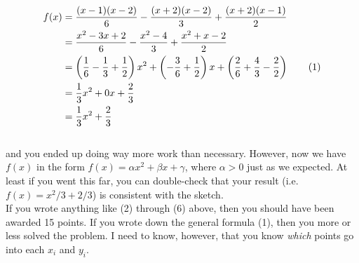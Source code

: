 \documentclass{article}
\newcommand\numberthis{\addtocounter{equation}{1}\tag{\theequation}}
\def\a{\alpha}
\def\b{\beta}
\def\c{\gamma}
\begin{document}
\begin{align*}
f(x)  &=  \frac{(x - 1)(x - 2)}{6} -  \frac{(x + 2)(x - 2)}{3} + \frac{(x + 2)(x - 1)}{2} \\
&= \frac{x^2 - 3 x +2}{6} - \frac{x^2  - 4}{3} + \frac{x^2 + x - 2}{2} \\
&= \left( \frac{1}{6} - \frac{1}{3} + \frac{1}{2} \right) x^2 + \left( -\frac{3}{6} + \frac{1}{2} \right) x + \left( \frac{2}{6} + \frac{4}{3} - \frac{2}{2} \right) \numberthis \\
&= \frac{1}{3} x^2 + 0 x + \frac{2}{3} \\
&= \frac{1}{3} x^2 + \frac{2}{3} 
\end{align*}\\

{\setlength{\parindent}{0cm}
and you ended up doing way more work than necessary. However, now we have $f(x)$ in the form $f(x) = \a x^2 + \b x + \c$, where $\a > 0$ just as we expected. At least if you went this far, you can double-check that your result (i.e. $f(x) = x^2 / 3 + 2 / 3$) is consistent with the sketch. }\\

If you wrote anything like (2) through (6) above, then you should have been awarded 15 points. If you wrote down the general formula (1), then you more or less solved the problem. I need to know, however, that you know \textit{which} points go into each $x_i$ and $y_i$.
\end{document}

